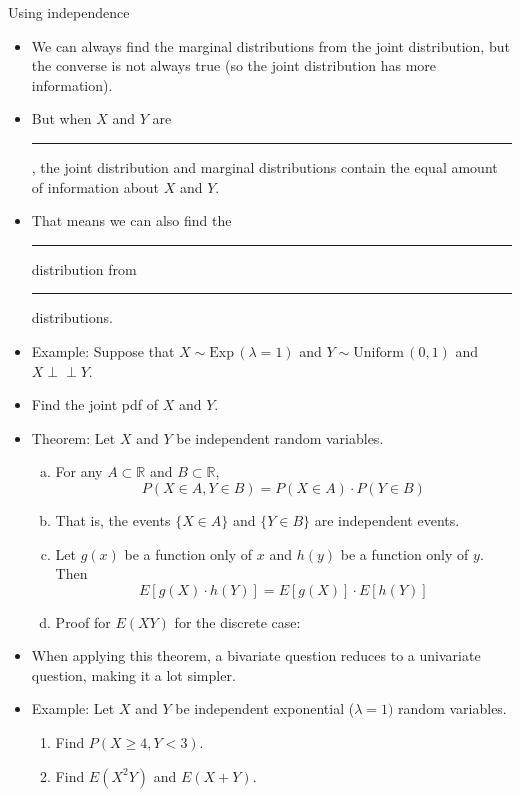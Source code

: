 \documentclass{article}
\newcommand{\blankul}[1]{\rule[-1.5mm]{#1}{0.15mm}}	%
\newcommand{\ind}{\perp \!\!\! \perp}			%
\newcommand{\follow}[1]{\sim \text{#1}\,}		%
\begin{document}
Using independence\bigskip
\begin{itemize}
    \item We can always find the marginal distributions from the joint distribution, but the converse is not always true (so the joint distribution has more information).
    \item But when $X$ and $Y$ are\blankul{2.5cm}, the joint distribution and marginal distributions contain the equal amount of information about $X$ and $Y$.
    \item[] That means we can also find the \blankul{2cm} distribution from \blankul{2cm} distributions.
    \item Example: Suppose that $X \follow{Exp}(\lambda = 1)$ and $Y \follow{Uniform}(0,1)$ and $X \ind Y$.
    \item[] Find the joint pdf of $X$ and $Y$.\vspace{110pt}
    \item Theorem: Let $X$ and $Y$ be independent random variables.
    \begin{enumerate}[(a)]
         \item For any $A \subset \mathbb{R}$ and $B\subset \mathbb{R}$, 
         \[P(X \in A,Y \in B) = P(X \in A) \cdot P(Y \in B)\]
         \item[] That is, the events $\{X \in A\}$ and $\{Y \in B\}$ are independent events.\bigskip 
        \item Let $g(x)$ be a function only of $x$ and $h(y)$ be a function only of $y$. Then
        \[E[g(X) \cdot h(Y)] = E[g(X)] \cdot E[h(Y)]\]
        \item[] Proof for $E(XY)$ for the discrete case:\vspace{100pt}
    \end{enumerate}

    \item When applying this theorem, a bivariate question reduces to a univariate question, making it a lot simpler.
    \item[] Example: Let $X$ and $Y$ be independent exponential ($\lambda = 1)$ random variables.
    \begin{enumerate}
        \item Find $P(X \ge 4, Y < 3)$.\vspace{80pt}
        \item Find $E(X^2Y)$ and $E(X + Y)$.\vspace{80pt}
    \end{enumerate}
\end{itemize}\bigskip
\end{document}
